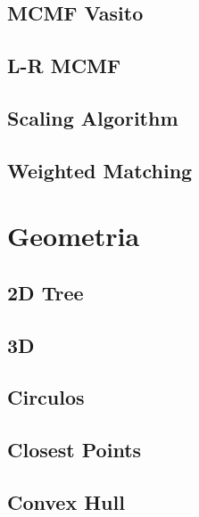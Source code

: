 \subsection{MCMF Vasito}
\raggedbottom
\hrulefill
\subsection{L-R MCMF}
\raggedbottom
\hrulefill
\subsection{Scaling Algorithm}
\raggedbottom
\hrulefill
\subsection{Weighted Matching}
\raggedbottom
\hrulefill

\section{Geometria}
\subsection{2D Tree}
\raggedbottom
\hrulefill
\subsection{3D}
\raggedbottom
\hrulefill
\subsection{Circulos}
\raggedbottom
\hrulefill
\subsection{Closest Points}
\raggedbottom
\hrulefill
\subsection{Convex Hull}
\raggedbottom
\hrulefill
